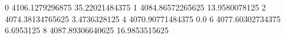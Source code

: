 0 4106.1279296875 35.22021484375
1 4084.86572265625 13.9580078125
2 4074.38134765625 3.4736328125
4 4070.90771484375 0.0
6 4077.60302734375 6.6953125
8 4087.89306640625 16.9853515625
